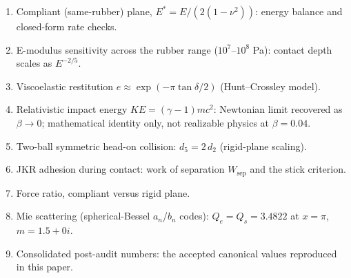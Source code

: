 \documentclass[12pt,twoside]{article}
\begin{document}
\begin{enumerate}
  \item Compliant (same-rubber) plane, $E^{*}=E/(2(1-\nu^2))$: energy balance and closed-form rate checks.
  \item E-modulus sensitivity across the rubber range ($10^7$--$10^8$ Pa): contact depth scales as $E^{-2/5}$.
  \item Viscoelastic restitution $e \approx \exp(-\pi\tan\delta/2)$ (Hunt--Crossley model).
  \item Relativistic impact energy $\mathit{KE}=(\gamma-1)mc^2$: Newtonian limit recovered as $\beta\to 0$; mathematical identity only, not realizable physics at $\beta=0.04$.
  \item Two-ball symmetric head-on collision: $d_5 = 2\,d_2$ (rigid-plane scaling).
  \item JKR adhesion during contact: work of separation $W_{\mathrm{sep}}$ and the stick criterion.
  \item Force ratio, compliant versus rigid plane.
  \item Mie scattering (spherical-Bessel $a_n$/$b_n$ codes): $Q_e = Q_s = 3.4822$ at $x=\pi$, $m=1.5+0i$.
  \item Consolidated post-audit numbers: the accepted canonical values reproduced in this paper.
\end{enumerate}
\end{document}
